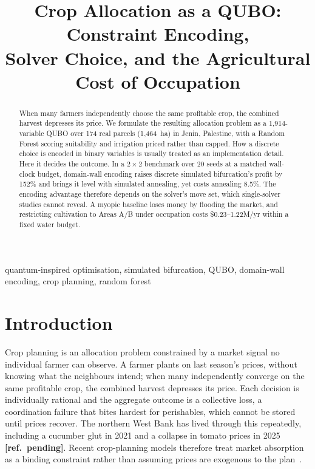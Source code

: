 \documentclass[conference,a4paper]{IEEEtran}
\newcommand{\refpending}{\textbf{[ref.\ pending]}}
\begin{document}
\title{Crop Allocation as a QUBO: Constraint Encoding,\\Solver Choice, and the Agricultural Cost of Occupation}

\author{
}

\maketitle
\thispagestyle{empty}

\begin{abstract}
When many farmers independently choose the same profitable crop, the
combined harvest depresses its price. We formulate the resulting allocation
problem as a 1{,}914-variable QUBO over 174 real parcels (1{,}464~ha) in
Jenin, Palestine, with a Random Forest scoring suitability and irrigation
priced rather than capped. How a discrete choice is encoded in binary
variables is usually treated as an implementation detail. Here it decides the
outcome. In a $2\times2$ benchmark over 20 seeds at a matched wall-clock
budget, domain-wall encoding raises discrete simulated bifurcation's profit by
152\% and brings it level with simulated annealing, yet costs annealing
8.5\%. The encoding advantage therefore depends on the solver's move set,
which single-solver studies cannot reveal. A myopic baseline loses money by
flooding the market, and restricting cultivation to Areas A/B under occupation
costs \$0.23--1.22M/yr within a fixed water budget.
\end{abstract}

\begin{IEEEkeywords}
quantum-inspired optimisation, simulated bifurcation, QUBO, domain-wall
encoding, crop planning, random forest
\end{IEEEkeywords}

\section{Introduction}

Crop planning is an allocation problem constrained by a market signal no
individual farmer can observe. A farmer plants on last season's prices,
without knowing what the neighbours intend; when many independently converge
on the same profitable crop, the combined harvest depresses its price. Each decision is individually rational and the aggregate
outcome is a collective loss, a coordination failure that bites hardest for
perishables, which cannot be stored until prices recover. The northern West
Bank has lived through this repeatedly, including a cucumber glut in 2021 and
a collapse in tomato prices in 2025 \refpending. Recent crop-planning models
therefore treat market absorption as a binding constraint rather than assuming
prices are exogenous to the plan~\cite{li2025,hou2026}.
\end{document}
